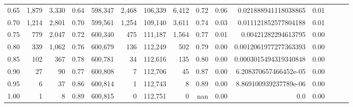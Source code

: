 \begin{tabular}{rrrrrrrrrrrrrrr}
0.65 &    1,879 &   3,330 &  0.64 &  598,347 &    2,468 &  106,339 &    6,412 &  0.72 &  0.06 &   0.021888941118038865 &      0.01 \\
0.70 &    1,214 &   2,801 &  0.70 &  599,561 &    1,254 &  109,140 &    3,611 &  0.74 &  0.03 &   0.011121852577804188 &      0.01 \\
0.75 &      779 &   2,047 &  0.72 &  600,340 &      475 &  111,187 &    1,564 &  0.77 &  0.01 &    0.00421282294613795 &      0.00 \\
0.80 &      339 &   1,062 &  0.76 &  600,679 &      136 &  112,249 &      502 &  0.79 &  0.00 &  0.0012061977277363393 &      0.00 \\
0.85 &      102 &     367 &  0.78 &  600,781 &       34 &  112,616 &      135 &  0.80 &  0.00 &  0.0003015494319340848 &      0.00 \\
0.90 &       27 &      90 &  0.77 &  600,808 &        7 &  112,706 &       45 &  0.87 &  0.00 &  6.208370657466452e-05 &      0.00 \\
0.95 &        6 &      37 &  0.86 &  600,814 &        1 &  112,743 &        8 &  0.89 &  0.00 &  8.869100939237789e-06 &      0.00 \\
1.00 &        1 &       8 &  0.89 &  600,815 &        0 &  112,751 &        0 &   nan &  0.00 &                    0.0 &      0.00 \\
\bottomrule
\end{tabular}

